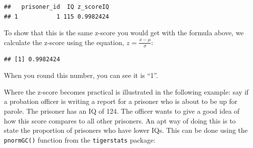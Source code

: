 \documentclass[
]{book}
\newenvironment{Shaded}{\begin{snugshade}}{\end{snugshade}}
\newcommand{\CommentTok}[1]{\textcolor[rgb]{0.56,0.35,0.01}{\textit{#1}}}
\newcommand{\DecValTok}[1]{\textcolor[rgb]{0.00,0.00,0.81}{#1}}
\newcommand{\FunctionTok}[1]{\textcolor[rgb]{0.00,0.00,0.00}{#1}}
\newcommand{\NormalTok}[1]{#1}
\newcommand{\OtherTok}[1]{\textcolor[rgb]{0.56,0.35,0.01}{#1}}
\newcommand{\SpecialCharTok}[1]{\textcolor[rgb]{0.00,0.00,0.00}{#1}}
\begin{document}
\begin{Shaded}
\end{Shaded}

\begin{verbatim}
##   prisoner_id  IQ z_scoreIQ
## 1           1 115 0.9982424
\end{verbatim}

To show that this is the same z-score you would get with the formula above, we calculate the z-score using the equation, \(z = \frac{x - \mu}{\sigma}\):

\begin{Shaded}
\end{Shaded}

\begin{verbatim}
## [1] 0.9982424
\end{verbatim}

When you round this number, you can see it is ``1''.

Where the z-score becomes practical is illustrated in the following example: say if a probation officer is writing a report for a prisoner who is about to be up for parole. The prisoner has an IQ of 124. The officer wants to give a good idea of how this score compares to all other prisoners. An apt way of doing this is to state the proportion of prisoners who have lower IQs. This can be done using the \texttt{pnormGC()} function from the \texttt{tigerstats} package:
\end{document}
